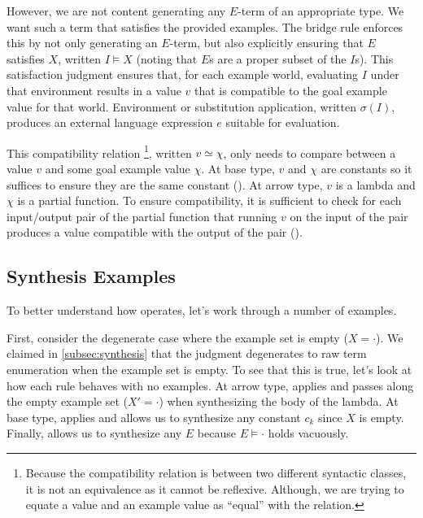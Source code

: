 However, we are not content generating any $E$-term of an appropriate type.
We want such a term that satisfies the provided examples.
The bridge rule  enforces this by not only generating an $E$-term, but also explicitly ensuring that $E$ satisfies $Χ$, written $I ⊨ Χ$ (noting that $E$s are a proper subset of the $I$s).
This satisfaction judgment ensures that, for each example world, evaluating $I$ under that environment results in a value $v$ that is compatible to the goal example value for that world.
Environment or substitution application, written $σ(I)$, produces an external language expression $e$ suitable for evaluation.

This compatibility relation%
\footnote{%
  Because the compatibility relation is between two different syntactic classes, it is not an equivalence as it cannot be reflexive.
  Although, we are trying to equate a value and an example value as ``equal'' with the relation.
},
written $v ≃ χ$, only needs to compare between a value $v$ and some goal example value $χ$.
At base type, $v$ and $χ$ are constants so it suffices to ensure they are the same constant ().
At arrow type, $v$ is a lambda and $χ$ is a partial function.
To ensure compatibility, it is sufficient to check for each input/output pair of the partial function that running $v$ on the input of the pair produces a value compatible with the output of the pair ().

\subsection{Synthesis Examples}
\label{subsec:synthesis-examples}

To better understand how \lsyn{} operates, let's work through a number of examples.

\begin{example}
  First, consider the degenerate case where the example set is empty ($Χ = ·$).
  We claimed in \autoref{subsec:synthesis} that the  judgment degenerates to raw term enumeration when the example set is empty.
  To see that this is true, let's look at how each  rule behaves with no examples.
  At arrow type,  applies and passes along the empty example set ($Χ' = ·$) when synthesizing the body of the lambda.
  At base type,  applies and allows us to synthesize any constant $c_k$ since $Χ$ is empty.
  Finally,  allows us to synthesize any $E$ because $E ⊨ ·$ holds vacuously.
\end{example}

